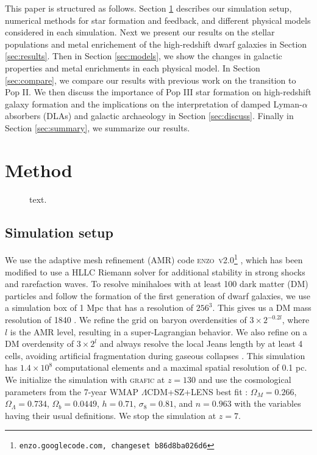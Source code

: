 \documentclass[useAMS,usenatbib]{mn2e}
\begin{document}
This paper is structured as follows.  Section \ref{sec:setup}
describes our simulation setup, numerical methods for star formation
and feedback, and different physical models considered in each
simulation.  Next we present our results on the stellar populations
and metal enrichement of the high-redshift dwarf galaxies in Section
\ref{sec:results}.  Then in Section \ref{sec:models}, we show the
changes in galactic properties and metal enrichments in each physical
model.  In Section \ref{sec:compare}, we compare our results with
previous work on the transition to Pop II.  We then discuss the
importance of Pop III star formation on high-redshift galaxy
formation and the implications on the interpretation of damped
Lyman-$\alpha$ absorbers (DLAs) and galactic archaeology in Section
\ref{sec:discuss}.  Finally in Section \ref{sec:summary}, we summarize
our results.

\section{Method}
\label{sec:setup}

\begin{figure*}
  \caption{\label{fig:evo-mosaic} text.}
\end{figure*}

\subsection{Simulation setup}

We use the adaptive mesh refinement (AMR) code
\textsc{enzo~v2.0}\footnote{\texttt{enzo.googlecode.com, changeset
    b86d8ba026d6}} \citep{OShea2004}, which has been modified to use a
HLLC Riemann solver \citep{Toro94_HLLC} for additional stability in
strong shocks and rarefaction waves.  To resolve minihaloes with at
least 100 dark matter (DM) particles and follow the formation of the
first generation of dwarf galaxies, we use a simulation box of 1 Mpc
that has a resolution of $256^3$.  This gives us a DM mass resolution
of 1840 \Ms.  We refine the grid on baryon overdensities of $3 \times
2^{-0.2l}$, where $l$ is the AMR level, resulting in a
super-Lagrangian behavior.  We also refine on a DM overdensity of $3
\times 2^l$ and always resolve the local Jeans length by at least 4
cells, avoiding artificial fragmentation during gaseous collapses
\citep{Truelove97}.  This simulation has $1.4 \times 10^8$
computational elements and a maximal spatial resolution of 0.1 pc.  We
initialize the simulation with \textsc{grafic} \citep{Bertschinger01}
at $z = 130$ and use the cosmological parameters from the 7-year WMAP
$\Lambda$CDM+SZ+LENS best fit \citep{WMAP7}: $\Omega_M = 0.266$,
$\Omega_\Lambda = 0.734$, $\Omega_b = 0.0449$, $h = 0.71$, $\sigma_8 =
0.81$, and $n = 0.963$ with the variables having their usual
definitions.  We stop the simulation at $z=7$.
\end{document}
